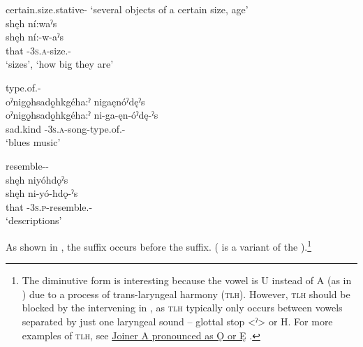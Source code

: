 \ea\label{ex:vpluralex4}  certain.size.stative-{\plural} ‘several objects of a certain size, age’\\
shęh ní:waˀs \\
\gll shęh ní:-w-aˀs\\
 that {\partitive}-\textsc{3s.a}-size.{\stat}-{\plural}\\
\glt ‘sizes’, `how big they are'
\z


\ea\label{ex:vpluralex}  type.of.{\stat}-{\plural}\\
oˀnigǫ̱hsadǫ̱hkgéha:ˀ nigaęnóˀdęˀs\\
\gll oˀnigǫ̱hsadǫ̱hkgéha:ˀ ni-ga-ęn-óˀdę-ˀs\\
 sad.kind {\partitive}-\textsc{3s.a}-song-type.of.{\stat}-{\plural}\\
\glt `blues music'

\z


\ea\label{ex:vpluralex299}  resemble-{\stat}-{\plural}\\
shęh niyóhdǫˀs\\
\gll shęh ni-yó-hdǫ-ˀs \\
 that {\partitive}-\textsc{3s.p}-resemble.{\stat}-{\plural}\\
\glt `descriptions'
\z



As shown in , the  {\plural} suffix occurs before the \textsc{\diminutive} suffix. ( is a variant of the  \textsc{\diminutive}).\footnote{The diminutive form  is interesting because the vowel is U instead of A (as in ) due to a process of trans-laryngeal harmony (\textsc{tlh}). However, \textsc{tlh} should be blocked by the intervening  \textsc{\plural} in , as \textsc{tlh} typically only occurs between vowels separated by just one laryngeal sound -- glottal stop <ˀ> or H. For more examples of \textsc{tlh}, see \href{Joiner A pronounced as Ǫ or Ę}{Joiner A pronounced as Ǫ or Ę} .}

